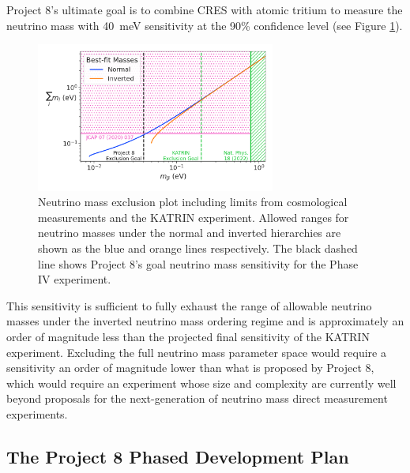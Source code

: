 Project 8's ultimate goal is to combine CRES with atomic tritium to measure the neutrino mass with 40~meV sensitivity at the 90\% confidence level (see Figure \ref{fig:chap3-p8-nu-mass-goal}).
\begin{figure}[htbp]
    \centering
    \includegraphics[width=0.7\textwidth]{figs/Chapter-3/230303_sum_nu_mass_vs_m_beta_with_exclusion_and_goal.png}
    \caption{Neutrino mass exclusion plot including limits from cosmological measurements and the KATRIN experiment. Allowed ranges for neutrino masses under the normal and inverted hierarchies are shown as the blue and orange lines respectively. The black dashed line shows Project 8's goal neutrino mass sensitivity for the Phase IV experiment.}
    \label{fig:chap3-p8-nu-mass-goal}
\end{figure}
This sensitivity is sufficient to fully exhaust the range of allowable neutrino masses under the inverted neutrino mass ordering regime and is approximately an order of magnitude less than the projected final sensitivity of the KATRIN experiment. Excluding the full neutrino mass parameter space would require a sensitivity an order of magnitude lower than what is proposed by Project 8, which would require an experiment whose size and complexity are currently well beyond proposals for the next-generation of neutrino mass direct measurement experiments.

\subsection{The Project 8 Phased Development Plan}

